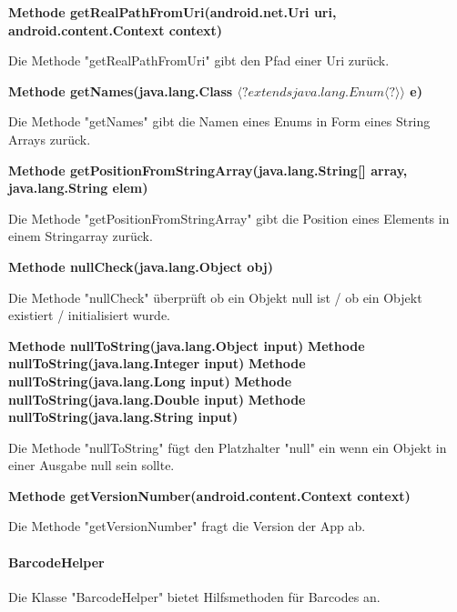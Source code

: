 \documentclass{scrartcl}
\begin{document}
\noindent\textbf{Methode getRealPathFromUri(android.net.Uri uri, \newline                  android.content.Context context)}

\noindent Die Methode "getRealPathFromUri" gibt den Pfad einer Uri zurück. \newline

\noindent\textbf{Methode getNames(java.lang.Class $\langle? extends java.lang.Enum\langle?\rangle\rangle$ e)}

\noindent Die Methode "getNames" gibt die Namen eines Enums in Form eines String Arrays zurück. \newline 

\noindent\textbf{Methode getPositionFromStringArray(java.lang.String[] array, \newline
                                             java.lang.String elem)}

\noindent Die Methode "getPositionFromStringArray" gibt die Position eines Elements in einem Stringarray zurück. \newline 

\noindent\textbf{Methode nullCheck(java.lang.Object obj)}

\noindent Die Methode "nullCheck" überprüft ob ein Objekt null ist / ob ein Objekt existiert / initialisiert wurde. \newline 

\noindent\textbf{Methode nullToString(java.lang.Object input)\newline}
\noindent\textbf{Methode nullToString(java.lang.Integer input)\newline}
\noindent\textbf{Methode nullToString(java.lang.Long input)\newline}
\noindent\textbf{Methode nullToString(java.lang.Double input)\newline}
\noindent\textbf{Methode nullToString(java.lang.String input)\newline}

\noindent Die Methode "nullToString" fügt den Platzhalter "null" ein wenn ein Objekt in einer Ausgabe null sein sollte. \newline 

\noindent\textbf{Methode getVersionNumber(android.content.Context context)}

\noindent Die Methode "getVersionNumber" fragt die Version der App ab.\newline 

\paragraph{BarcodeHelper}
Die Klasse "BarcodeHelper" bietet Hilfsmethoden für Barcodes an. \newline 
\end{document}
